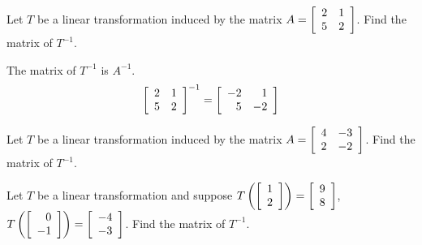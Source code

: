 \begin{enumialphparenastyle}
\begin{ex} Let $T$ be a linear transformation induced by the matrix $A = \left[ \begin{array}{rr}
2 & 1 \\
5 & 2 
\end{array} \right]$. Find the matrix of $T^{-1}$.
\begin{sol}
The matrix of $T^{-1}$ is $A^{-1}$.
\[
\left[ \begin{array}{rr}
2 & 1 \\
5 & 2 
\end{array} \right] ^{-1} = 
\left[
\begin{array}{rr}
-2 & 1 \\
5 & -2
\end{array}
\right]
\]
\end{sol}
\end{ex}

\begin{ex} Let $T$ be a linear transformation induced by the matrix $A = \left[ \begin{array}{rr}
4 & -3 \\
2 & -2 
\end{array} \right]$. Find the matrix of $T^{-1}$. 
\end{ex}

\begin{ex} Let $T$ be a linear transformation and suppose $T \left( \left[ \begin{array}{r}
1 \\
2
\end{array}\right] \right) = \left[ \begin{array}{r}
9 \\
8
\end{array} \right]$, $T \left( \left[ \begin{array}{r}
0 \\
-1
\end{array}\right] \right) = \left[ \begin{array}{r}
-4 \\
-3
\end{array}\right]$. 
Find the matrix of $T^{-1}$. 
\end{ex}

\end{enumialphparenastyle}